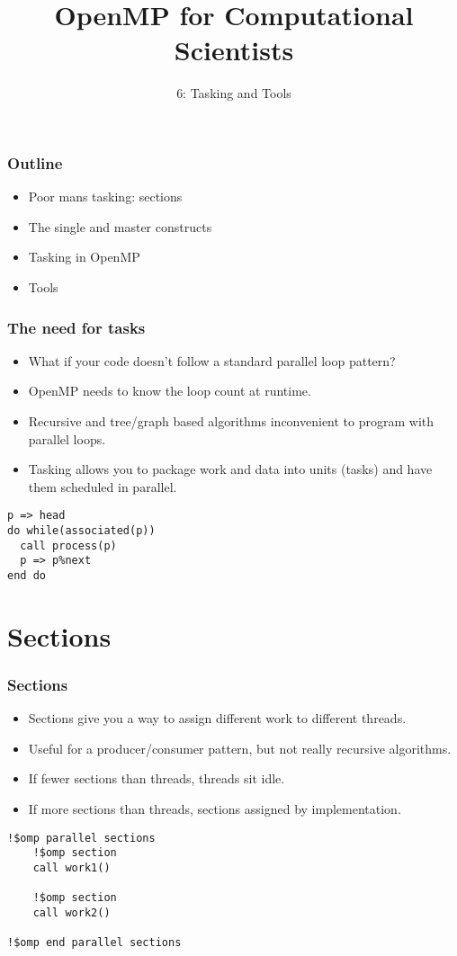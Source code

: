 \documentclass{beamer}
\title{OpenMP for Computational Scientists}
\subtitle{6: Tasking and Tools}
\begin{document}
\frame{\titlepage}

\begin{frame}
\frametitle{Outline}
\begin{itemize}
  \item Poor mans tasking: sections
  \item The single and master constructs
  \item Tasking in OpenMP
  \item Tools
\end{itemize}
\end{frame}

\begin{frame}[fragile]
\frametitle{The need for tasks}
\begin{itemize}
  \item What if your code doesn't follow a standard parallel loop pattern?
  \item OpenMP needs to know the loop count at runtime.
  \item Recursive and tree/graph based algorithms inconvenient to program with parallel loops.
  \item Tasking allows you to package work and data into units (tasks) and have them scheduled in parallel.
\end{itemize}

\begin{verbatim}
p => head
do while(associated(p))
  call process(p)
  p => p%next
end do
\end{verbatim}
\end{frame}
\section{Sections}
\begin{frame}[fragile]
\frametitle{Sections}
\begin{itemize}
  \item Sections give you a way to assign different work to different threads.
  \item Useful for a producer/consumer pattern, but not really recursive algorithms.
  \item If fewer sections than threads, threads sit idle.
  \item If more sections than threads, sections assigned by implementation.
\end{itemize}

\begin{verbatim}
!$omp parallel sections
    !$omp section
    call work1()

    !$omp section
    call work2()

!$omp end parallel sections
\end{verbatim}
\end{frame}
\end{document}

